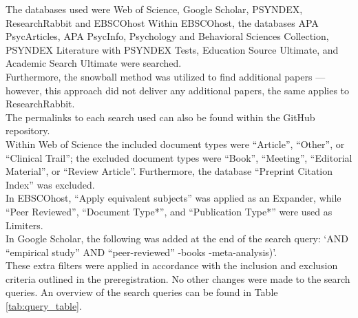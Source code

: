 \documentclass[
  stu,floatsintext]{apa7}
\begin{document}
The databases used were Web of Science, Google Scholar, PSYNDEX, ResearchRabbit and EBSCOhost Within EBSCOhost, the databases APA PsycArticles, APA PsycInfo, Psychology and Behavioral Sciences Collection, PSYNDEX Literature with PSYNDEX Tests, Education Source Ultimate, and Academic Search Ultimate were searched.\\
Furthermore, the snowball method was utilized to find additional papers --- however, this approach did not deliver any additional papers, the same applies to ResearchRabbit.\\
The permalinks to each search used can also be found within the GitHub repository.\\
Within Web of Science the included document types were ``Article'', ``Other'', or ``Clinical Trail''; the excluded document types were ``Book'', ``Meeting'', ``Editorial Material'', or ``Review Article''.
Furthermore, the database ``Preprint Citation Index'' was excluded.\\
In EBSCOhost, ``Apply equivalent subjects'' was applied as an Expander, while ``Peer Reviewed'', ``Document Type*'', and ``Publication Type*'' were used as Limiters.\\
In Google Scholar, the following was added at the end of the search query: `AND ``empirical study'' AND ``peer-reviewed'' -books -meta-analysis)'.\\
These extra filters were applied in accordance with the inclusion and exclusion criteria outlined in the preregistration. No other changes were made to the search queries. An overview of the search queries can be found in Table \ref{tab:query_table}.
\end{document}

